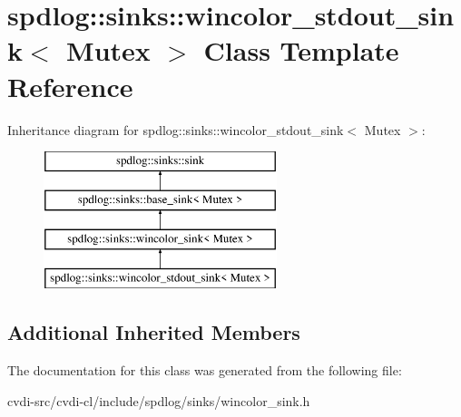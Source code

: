\hypertarget{classspdlog_1_1sinks_1_1wincolor__stdout__sink}{}\section{spdlog\+:\+:sinks\+:\+:wincolor\+\_\+stdout\+\_\+sink$<$ Mutex $>$ Class Template Reference}
\label{classspdlog_1_1sinks_1_1wincolor__stdout__sink}
Inheritance diagram for spdlog\+:\+:sinks\+:\+:wincolor\+\_\+stdout\+\_\+sink$<$ Mutex $>$\+:\begin{figure}[H]
\begin{center}
\leavevmode
\includegraphics[height=4.000000cm]{classspdlog_1_1sinks_1_1wincolor__stdout__sink}
\end{center}
\end{figure}
\subsection*{Additional Inherited Members}


The documentation for this class was generated from the following file\+:\begin{DoxyCompactItemize}
\item 
cvdi-\/src/cvdi-\/cl/include/spdlog/sinks/wincolor\+\_\+sink.\+h\end{DoxyCompactItemize}
